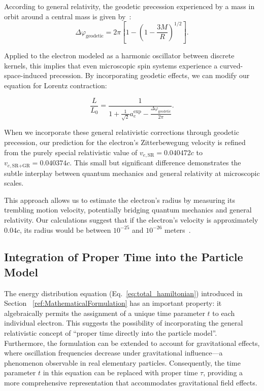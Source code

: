 \documentclass[%
 reprint,
 amsmath,amssymb,
 aps,
]{revtex4-1}
\numberwithin{equation}{section}%
\begin{document}
According to general relativity, the geodetic precession experienced by a mass in orbit around a central mass is given by~\cite{hartle2021}:
\begin{equation}
\Delta\varphi_{\text{geodetic}} = 2\pi \left[1 - \left(1 - \frac{3M}{R} \right)^{1/2} \right].
\label{eq:geodetic_precession}
\end{equation}

Applied to the electron modeled as a harmonic oscillator between discrete kernels, this implies that even microscopic spin systems experience a curved-space-induced precession. By incorporating geodetic effects, we can modify our equation for Lorentz contraction:

\vspace{0.1cm}

\begin{equation}
\frac{L}{L_0} = \frac{1}{1 + \frac{1}{\sqrt{2}}a_e^{\text{exp}} - \frac{\Delta\varphi_{\text{geodetic}}}{2\pi}}.
\label{eq:core_equation}
\end{equation}

\vspace{0.3cm}

When we incorporate these general relativistic corrections through geodetic precession, our prediction for the electron's Zitterbewegung velocity is refined from the purely special relativistic value of $v_{e,\text{SR}} = 0.040472c$ to $v_{e,\text{SR+GR}} = 0.040374c$. This small but significant difference demonstrates the subtle interplay between quantum mechanics and general relativity at microscopic scales.

This approach allows us to estimate the electron's radius by measuring its trembling motion velocity, potentially bridging quantum mechanics and general relativity. Our calculations suggest that if the electron's velocity is approximately $0.04c$, its radius would be between $10^{-25}$ and $10^{-26}$ meters~\cite{hanamura2025}.


\subsection{Integration of Proper Time into the Particle Model}

The energy distribution equation (Eq.~\ref{eq:total_hamiltonian}) introduced in Section ~\ref{ref:MathematicalFormulation} has an important property: it algebraically permits the assignment of a unique time parameter $t$ to each individual electron. This suggests the possibility of incorporating the general relativistic concept of ``proper time directly into the particle model''. Furthermore, the formulation can be extended to account for gravitational effects, where oscillation frequencies decrease under gravitational influence—a phenomenon observable in real elementary particles. Consequently, the time parameter $t$ in this equation can be replaced with proper time $\tau$, providing a more comprehensive representation that accommodates gravitational field effects.
\end{document}
